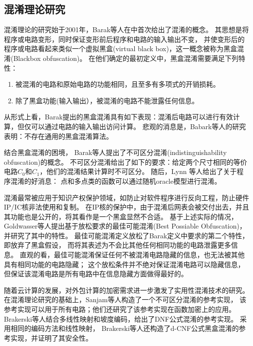 \subsection{混淆理论研究}
混淆理论的研究始于2001年，Barak等人在中首次给出了混淆的概念。
其思想是将程序或电路变形，同时保证变形前后程序和电路的输入输出不变，
并使变形后的程序或电路看起来类似一个虚拟黑盒(virtual black box)，这一概念被称为黑盒混淆(Blackbox obfuscation)。
在他们确定的最初定义中，黑盒混淆需要满足下列特性：

\begin{enumerate}
\item 被混淆的电路和原始电路的功能相同，且至多有多项式的开销损耗。
\item 除了黑盒功能(输入输出），被混淆的电路不能泄露任何信息。
\end{enumerate}

从形式上看，Barak提出的黑盒混淆具有如下表现：混淆后电路可以进行有效计算，但仅可以通过电路的输入输出访问计算。
悲观的消息是，Babark等人的研究表明：不存在通用的黑盒混淆算法。

结合黑盒混淆的困境，
Barak等人提出了不可区分混淆(indistinguishability obfuscation)的概念。
不可区分混淆给出了如下的要求：给定两个尺寸相同的等价电路$C_0$和$C_1$，他们的混淆结果计算时不可区分。
随后，Lynn 等人给出了关于程序混淆的好消息：
点和多点类的函数可以通过随机oracle模型进行混淆。

混淆最常被应用于知识产权保护领域，如防止对软件程序进行反向工程，防止硬件IP/IC核非法使用和复制。
在IP核的保护中，由于混淆后网表会被交付出去，并且其功能也是公开的，将其看作是一个黑盒显然不合适。
基于上述实际的情况，Goldwasser等人提出基于放松要求的最佳可能混淆(Best Possiable Obfuscation)，并研究了其中的特性。
最佳可能混淆定义放松了Barak定义中要求的第二个特性，即放弃了黑盒假设，
而将其表述为不会比其他任何相同功能的电路泄露更多信息。
直观的看，最佳可能混淆保证任何不被混淆电路隐藏的信息，也无法被其他具有相同功能的电路隐藏；
这个放松条件并不绝对保证混淆电路可以隐藏信息，但保证该混淆电路是所有电路中在信息隐藏方面做得最好的。

随着云计算的发展，对外包计算的加密需求进一步激发了实用性混淆技术的研究。
在混淆理论研究的基础上，Sanjam等人构造了一个不可区分混淆的参考实现，
该参考实现可以用于所有电路；他们还研究了该参考实现在函数加密上的应用。
Brakerski等人结合多线性映射和坡度编码，给出了DNF公式混淆的参考实现。
采用相同的编码方法和线性映射，
Brakerski等人还构造了d-CNF公式黑盒混淆的参考实现，并证明了其安全性。

